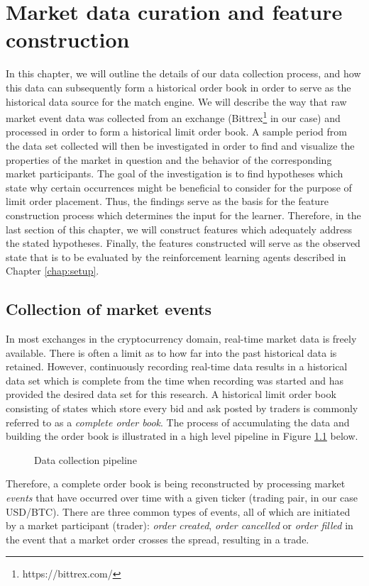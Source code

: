 \chapter{Market data curation and feature construction}
\label{chap:data}

In this chapter, we will outline the details of our data collection process, and how this data can subsequently form a historical order book in order to serve as the historical data source for the match engine.
We will describe the way that raw market event data was collected from an exchange (Bittrex\footnote{https://bittrex.com/} in our case) and processed in order to form a historical limit order book.
A sample period from the data set collected will then be investigated in order to find and visualize the properties of the market in question and the behavior of the corresponding market participants.
The goal of the investigation is to find hypotheses which state why certain occurrences might be beneficial to consider for the purpose of limit order placement.
Thus, the findings serve as the basis for the feature construction process which determines the input for the learner.
Therefore, in the last section of this chapter, we will construct features which adequately address the stated hypotheses.
Finally, the features constructed will serve as the observed state that is to be evaluated by the reinforcement learning agents described in Chapter \ref{chap:setup}.

\section{Collection of market events}
\label{sec:data-collection}

In most exchanges in the cryptocurrency domain, real-time market data is freely available. 
There is often a limit as to how far into the past historical data is retained.
However, continuously recording real-time data results in a historical data set which is complete from the time when recording was started and has provided the desired data set for this research.
A historical limit order book consisting of states which store every bid and ask posted by traders is commonly referred to as a \textit{complete order book}.
The process of accumulating the data and building the order book is illustrated in a high level pipeline in Figure \ref{fig:data-pipeline} below.
\begin{figure}[H]
    \centering
    \caption{Data collection pipeline}
    \label{fig:data-pipeline}
\end{figure}
Therefore, a complete order book is being reconstructed by processing market \textit{events} that have occurred over time with a given ticker (trading pair, in our case USD/BTC).
There are three common types of events, all of which are initiated by a market participant (trader): \textit{order created}, \textit{order cancelled} or \textit{order filled} in the event that a market order crosses the spread, resulting in a trade.

